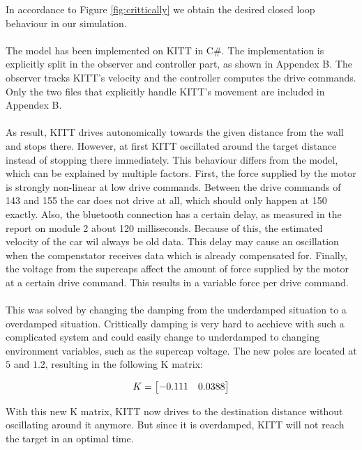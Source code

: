 \documentclass[final]{scrreprt} %
\begin{document}
In accordance to Figure \ref{fig:crittically} we obtain the desired closed loop behaviour in our simulation.
\\ \\
The model has been implemented on KITT in C\#. The implementation is explicitly split in the observer and controller part, as shown in Appendex B. The observer tracks KITT's velocity and the controller computes the drive commands. Only the two files that explicitly handle KITT's movement are included in Appendex B.
\\ \\
As result, KITT drives autonomically towards the given distance from the wall and stops there. However, at first KITT oscillated around the target distance instead of stopping there immediately. This behaviour differs from the model, which can be explained by multiple factors. First, the force supplied by the motor is strongly non-linear at low drive commands. Between the drive commands of 143 and 155 the car does not drive at all, which should only happen at 150 exactly. Also, the bluetooth connection has a certain delay, as measured in the report on module 2 about 120 milliseconds. Because of this, the estimated velocity of the car wil always be old data. This delay may cause an oscillation when the compenstator receives data which is already compensated for. Finally, the voltage from the supercaps affect the amount of force supplied by the motor at a certain drive command. This results in a variable force per drive command.
\\ \\
This was solved by changing the damping from the underdamped situation to a overdamped situation. Crittically damping is very hard to acchieve with such a complicated system and could easily change to underdamped to changing environment variables, such as the supercap voltage. The new poles are located at $5$ and $1.2$, resulting in the following K matrix:

\begin{equation}
\centering
K = 
\begin{bmatrix}
  -0.111 & 0.0388
\end{bmatrix}
\end{equation}

With this new K matrix, KITT now drives to the destination distance without oscillating around it anymore. But since it is overdamped, KITT will not reach the target in an optimal time.

\fi
\end{document}
